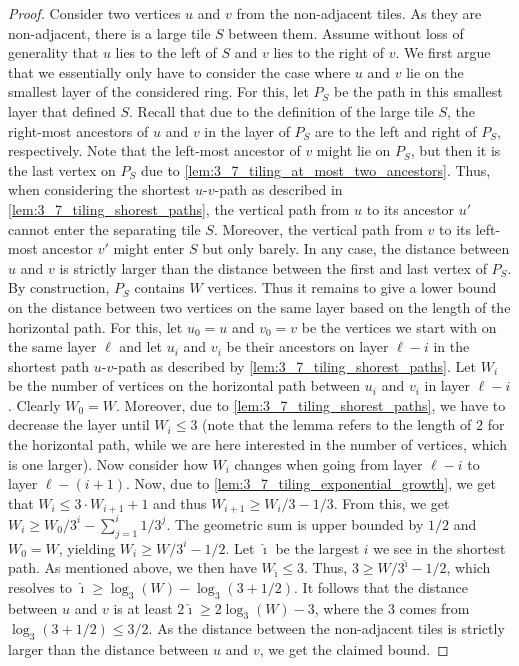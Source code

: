 \documentclass[11pt]{article}
\begin{document}
\begin{proof}
    Consider two vertices $u$ and $v$ from the non-adjacent tiles.
    As they are non-adjacent, there is a large tile $S$ between them.
    Assume without loss of generality that $u$ lies to the left of $S$ and $v$ lies to the right of $v$.
    We first argue that we essentially only have to consider the case where $u$ and $v$ lie on the smallest layer of the considered ring.
    For this, let $P_S$ be the path in this smallest layer that defined $S$.
    Recall that due to the definition of the large tile $S$, the right-most ancestors of $u$ and $v$ in the layer of $P_S$ are to the left and right of $P_S$, respectively.
    Note that the left-most ancestor of $v$ might lie on $P_S$, but then it is the last vertex on $P_S$ due to \cref{lem:3_7_tiling_at_most_two_ancestors}.
%
    Thus, when considering the shortest $u$-$v$-path as described in \cref{lem:3_7_tiling_shorest_paths}, the vertical path from $u$ to its ancestor $u'$ cannot enter the separating tile $S$.
    Moreover, the vertical path from $v$ to its left-most ancestor $v'$ might enter $S$ but only barely.
    In any case, the distance between $u$ and $v$ is strictly larger than the distance between the first and last vertex of $P_S$.
    By construction, $P_S$ contains $W$ vertices.
    Thus it remains to give a lower bound on the distance between two vertices on the same layer based on the length of the horizontal path.
%
    For this, let $u_0 = u$ and $v_0 = v$ be the vertices we start with on the same layer $\ell$ and let $u_i$ and $v_i$ be their ancestors on layer $\ell - i$ in the shortest path $u$-$v$-path as described by \cref{lem:3_7_tiling_shorest_paths}.
    Let $W_i$ be the number of vertices on the horizontal path between $u_i$ and $v_i$ in layer $\ell - i$.
    Clearly $W_0 = W$.
    Moreover, due to \cref{lem:3_7_tiling_shorest_paths}, we have to decrease the layer until $W_i \le 3$ (note that the lemma refers to the length of $2$ for the horizontal path, while we are here interested in the number of vertices, which is one larger).
    Now consider how $W_i$ changes when going from layer $\ell - i$ to layer $\ell - (i + 1)$.
    Now, due to \cref{lem:3_7_tiling_exponential_growth}, we get that $W_i \le 3 \cdot W_{i + 1} + 1$ and thus $W_{i + 1} \ge W_i / 3 - 1/3$.
    From this, we get $W_i \ge W_0 / 3^i - \sum_{j = 1}^i 1/3^j$.
    The geometric sum is upper bounded by $1/2$ and $W_0 = W$, yielding $W_i \ge W / 3^i - 1/2$.
    Let $\hat\imath$ be the largest $i$ we see in the shortest path.
    As mentioned above, we then have $W_{\hat\imath} \le 3$.
    Thus, $3 \ge W / 3^{\hat\imath} - 1/2$, which resolves to $\hat\imath \ge \log_3(W) - \log_3(3 + 1/2)$.
    It follows that the distance between $u$ and $v$ is at least $2\hat\imath \ge 2 \log_3(W) - 3$, where the $3$ comes from $\log_3(3 + 1/2) \le 3/2$.  As the distance between the non-adjacent tiles is strictly larger than the distance between $u$ and $v$, we get the claimed bound. 
\end{proof}
\end{document}
